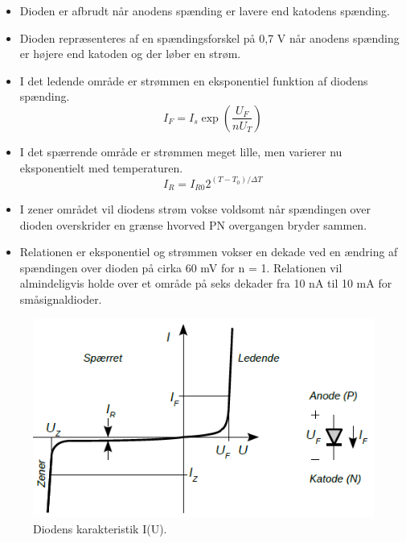 \documentclass[danish]{article}
\begin{document}
\begin{itemize}
	\item Dioden er afbrudt når anodens spænding er lavere end katodens spænding.
	\item Dioden repræsenteres af en spændingsforskel på 0,7 V når anodens spænding er højere end katoden og der løber en strøm.
\end{itemize}

\begin{itemize}
	\item I det ledende område er strømmen en eksponentiel funktion af diodens spænding.
	\begin{equation}
	I_F = I_s \exp \left(\dfrac{U_F}{n U_T}\right)
	\end{equation}
	\item I det spærrende område er strømmen meget lille, men varierer nu eksponentielt med temperaturen. 
	\begin{equation}
	I_R = I_{R0} 2^{(T-T_0)/\Delta{T}}
	\end{equation}
	\item I zener området vil diodens strøm vokse voldsomt når spændingen over dioden overskrider en grænse hvorved PN overgangen bryder sammen.
	\item Relationen er eksponentiel og strømmen vokser en dekade
	ved en ændring af spændingen over dioden på cirka 60 mV for n = 1. Relationen vil almindeligvis holde over et område på seks dekader fra 10 nA til 10 mA for småsignaldioder.
\end{itemize}

\begin{figure} [H]
	\centering
	\includegraphics[width=0.85\linewidth]{graphics/I-U_karakteristik}
	\caption{Diodens karakteristik I(U).}
	\label{fig:I-U_karakteristik}
\end{figure}
\end{document}
